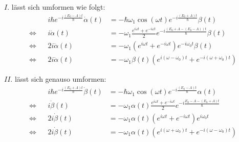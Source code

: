 \documentclass[11pt, ngerman, fleqn, DIV=15, headinclude]{scrartcl}
\begin{document}
	$I.$ lässt sich umformen wie folgt:
	\begin{align*}
		&&	i\hbar e^{-i\frac{(E_0-A)t}{\hbar}}\dot{\alpha}(t)&=-\hbar\omega_1 \cos(\omega t) e^{-i\frac{(E_0+A)t}{\hbar}}\beta(t) \\
		\Longleftrightarrow && 
			i\dot{\alpha}(t)&=-\omega_1\frac{e^{i\omega t}+e^{-i\omega t}}{2} e^{-i\frac{(E_0+A-(E_0-A))t}{\hbar}}\beta(t) \\
		\Longleftrightarrow && 
			2i\dot{\alpha}(t)&=-\omega_1(e^{i\omega t}+e^{-i\omega t})e^{-i\omega_0 t}\beta(t) \\
		\Longleftrightarrow &&
			2i\dot{\alpha}(t)&=-\omega_1\beta(t)(e^{i(\omega-\omega_0) t}+e^{-i(\omega+\omega_0) t})
	\end{align*}

	$II.$ lässt sich genauso umformen:
	\begin{align*}
		&&	i\hbar e^{-i\frac{(E_0+A)t}{\hbar}}\dot{\beta}(t)&=-\hbar\omega_1\cos(\omega t)e^{-i\frac{(E_0-A)t}{\hbar}} \alpha(t) \\
		\Longleftrightarrow && i\dot{\beta}(t)&=-\omega_1\alpha(t)\frac{e^{i\omega t}+e^{-i\omega t}}{2}e^{-i\frac{E_0-A-(E_0+A)t}{\hbar}} \\
		\Longleftrightarrow &&
			2i\dot{\beta}(t)&=-\omega_1\alpha(t)(e^{i\omega t}+e^{-i\omega t})e^{i\omega_0 t} \\
		\Longleftrightarrow &&
			2i\dot{\beta}(t)&=-\omega_1\alpha(t)(e^{i(\omega+\omega_0) t}+e^{-i(\omega-\omega_0) t})
	\end{align*}
\end{document}
